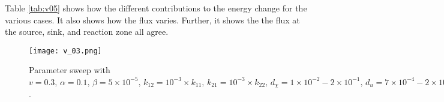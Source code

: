 \documentclass[11pt]{article}
\begin{document}
\begin{table}
\centering
\caption{Contributions to the energy functional $L(u,\chi)$, the phase field regularization, the flux $J_i$ of each species calculated at the boundary, and the reaction (right hand side of Eq. (\ref{eq:diffuse})$_1$) integrated on the domain for $v=0.5$. \label{tab:v05}}
\vspace{2mm}
\end{table}
Table \ref{tab:v05} shows how the different contributions to the energy change for the various cases. It also shows how the flux varies. Further, it shows the the flux at the source, sink, and reaction zone all agree.
\begin{figure}
\centering     
    \texttt{[image: v\_03.png]}
    \caption{Parameter sweep with $v=0.3,\,\alpha=0.1,\,\beta=5\times10^{-5},\,k_{12}=10^{-3}\times k_{11},\,k_{21}=10^{-3}\times k_{22},\, d_\chi=1\times10^{-2}-2\times10^{-1},\,d_u=7\times10^{-4}-2\times10^{-2},\,k_s=1\times10^2$.\label{fig:v03}}
\end{figure}
\end{document}
